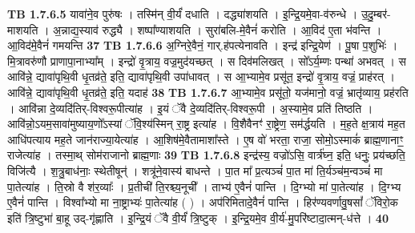 \documentclass[17pt]{extarticle}
\begin{document}
                  \newline
                                \textbf{ TB 1.7.6.5} \newline
                  यावा॑ने॒व पुरु॑षः । तस्मि॑न् वी॒र्यं॑ दधाति । दद्ध्या॑शयति । इ॒न्द्रि॒यमे॒वा-व॑रुन्धे । उ॒दु॒म्बर॑-माशयति । अ॒न्नाद्य॒स्याव॑ रुद्ध्यै । शष्पा᳚ण्याशयति । सुरा॑बलि-मे॒वैनं॑ करोति । आ॒विद॑ ए॒ता भ॑वन्ति । आ॒विद॑मे॒वैनं॑ गमयन्ति \textbf{ 37} \newline
                  \newline
                                \textbf{ TB 1.7.6.6} \newline
                  अ॒ग्निरे॒वैनं॒ गार्.ह॑पत्येनावति । इन्द्र॑ इन्द्रि॒येण॑ । पू॒षा प॒शुभिः॑ । मि॒त्रावरु॑णौ प्राणापा॒नाभ्या᳚म् । इन्द्रो॑ वृ॒त्राय॒ वज्र॒मुद॑यच्छत् । स दिव॑मलिखत् । सो᳚ऽर्य॒म्णः पन्था॑ अभवत् । स आवि॑न्ने॒ द्यावा॑पृथि॒वी धृ॒तव्र॑ते॒ इति॒ द्यावा॑पृथि॒वी उपा॑धावत् । स आ॒भ्यामे॒व प्रसू॑त॒ इन्द्रो॑ वृ॒त्राय॒ वज्रं॒ प्राह॑रत् । आवि॑न्ने॒ द्यावा॑पृथि॒वी धृ॒तव्र॑ते॒ इति॒ यदाह॑ \textbf{ 38} \newline
                  \newline
                                \textbf{ TB 1.7.6.7} \newline
                  आ॒भ्यामे॒व प्रसू॑तो॒ यज॑मानो॒ वज्रं॒ भ्रातृ॑व्याय॒ प्रह॑रति । आवि॑न्ना दे॒व्यदि॑तिर्-विश्वरू॒पीत्या॑ह । इ॒यं ॅवै दे॒व्यदि॑तिर्-विश्वरू॒पी । अ॒स्यामे॒व प्रति॑ तिष्ठति । आवि॑न्नो॒ऽयम॒सावा॑मुष्याय॒णो᳚ऽस्यां ॅवि॒श्य॑स्मिन् रा॒ष्ट्र इत्या॑ह । वि॒शैवैनꣳ॑ रा॒ष्ट्रेण॒ सम॑र्द्धयति । म॒ह॒ते क्ष॒त्राय॑ मह॒त आधि॑पत्याय मह॒ते जान॑राज्या॒येत्या॑ह । आ॒शिष॑मे॒वैतामाशा᳚स्ते । ए॒ष वो॑ भरता॒ राजा॒ सोमो॒ऽस्माकं॑ ब्राह्म॒णानाꣳ॒॒ राजेत्या॑ह । तस्मा॒थ् सोम॑राजानो ब्राह्म॒णाः \textbf{ 39} \newline
                  \newline
                                \textbf{ TB 1.7.6.8} \newline
                  इन्द्र॑स्य॒ वज्रो॑ऽसि॒ वार्त्र॑घ्न॒ इति॒ धनुः॒ प्रय॑च्छति॒ विजि॑त्यै । श॒त्रु॒बाध॑नाः॒ स्थेतीषून्॑ । शत्रू॑ने॒वास्य॑ बाधन्ते । पा॒त मा᳚ प्र॒त्यञ्चं॑ पा॒त मा॑ ति॒र्यञ्च॑म॒न्वञ्चं॑ मा पा॒तेत्या॑ह । ति॒स्रो वै श॑र॒व्याः᳚ । प्र॒तीची॑ ति॒रश्च्य॒नूची᳚ । ताभ्य॑ ए॒वैनं॑ पान्ति । दि॒ग्भ्यो मा॑ पा॒तेत्या॑ह । दि॒ग्भ्य ए॒वैनं॑ पान्ति । विश्वा᳚भ्यो मा ना॒ष्ट्राभ्यः॑ पा॒तेत्या॑ह ( ) । अप॑रिमितादे॒वैनं॑ पान्ति । हिर॑ण्यवर्णावु॒षसां᳚ ॅविरो॒क इति॑ त्रि॒ष्टुभा॑ बा॒हू उद्-गृ॑ह्णाति । इ॒न्द्रि॒यं ॅवै वी॒र्यं॑ त्रि॒ष्टुक् । इ॒न्द्रि॒यमे॒व वी॒र्य॑-मु॒परि॑ष्टादा॒त्मन्-ध॑त्ते । \textbf{ 40} \newline
\end{document}
